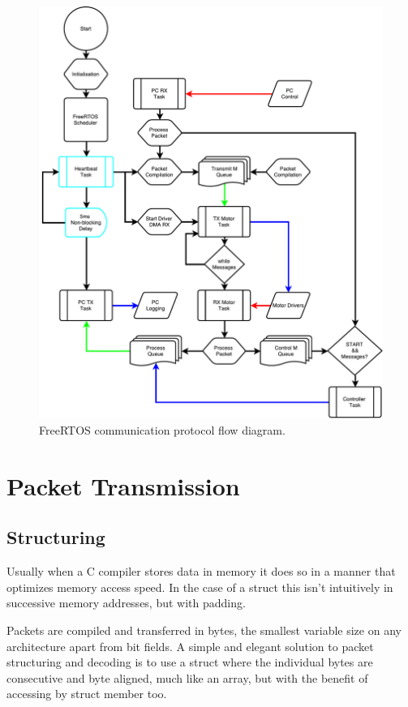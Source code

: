 \begin{figure}
\centering
\includegraphics[width=1\textwidth]{images/comms/communication-flow-diagram.pdf} 
\caption{FreeRTOS communication protocol flow diagram.}
\label{fig:FreeRTOS communication protocol flow diagram.}
\end{figure}

\section{Packet Transmission}
\label{sec:Packet Transmission}

\subsection{Structuring}
\label{sec:structuring}

Usually when a C compiler stores data in memory it does so in a manner that optimizes memory access speed. In the case of a struct this isn't intuitively in successive memory addresses, but with padding.

Packets are compiled and transferred in bytes, the smallest variable size on any architecture apart from bit fields. A simple and elegant solution to packet structuring and decoding is to use a struct where the individual bytes are consecutive and byte aligned, much like an array, but with the benefit of accessing by struct member too.

